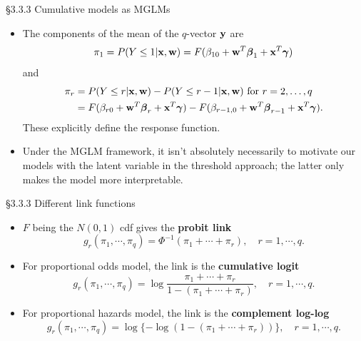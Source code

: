 \documentclass{beamer}
\newenvironment{wideitemize}%
  {\begin{itemize}%
    \setlength{\parskip}{1em}}%
  {\end{itemize}}
\begin{document}

\begin{frame}{\S3.3.3 Cumulative models as MGLMs}
\begin{wideitemize}


\item The components of the  mean of the $q$-vector ${\bf y}$  are  
\[
\pi_1 = P( Y \leq 1 | {\bf x}, {\bf w}) = F(\beta_{10}+\textbf{w}^T\mbox{\boldmath $\beta$}_1+
\textbf{x}^T\mbox{\boldmath $\gamma$})
\]
 and 
\begin{align*}
\pi_r 
& = P( Y \leq r | {\bf x}, {\bf w}) -  P( Y \leq r -1| {\bf x}, {\bf w}) \text{ for } r = 2, \dots, q\\
&= F(\beta_{r0}+\textbf{w}^T\mbox{\boldmath $\beta$}_r+
\textbf{x}^T\mbox{\boldmath $\gamma$}) - F(\beta_{r-1, 0}+\textbf{w}^T\mbox{\boldmath $\beta$}_{r-1}+
\textbf{x}^T\mbox{\boldmath $\gamma$}).
\end{align*}
 These explicitly define the response function.

\item Under the MGLM framework, it isn't absolutely necessarily  to motivate our models with the latent variable in the threshold approach; the latter only makes the model more interpretable.
\end{wideitemize}
\end{frame}


\begin{frame}{\S3.3.3 Different link functions}
\begin{wideitemize}
\item
$F$ being the $N(0,1)$ cdf gives the \textbf{probit link} 
$$g_r(\pi_1,\cdots,\pi_q)=\Phi^{-1}(\pi_1+\cdots+\pi_r), \quad r=1,\cdots,q.$$
\item
For proportional odds model, the link is the \textbf{cumulative logit}
$$g_r(\pi_1,\cdots,\pi_q)=\log\frac{\pi_1+\cdots+\pi_r}{1-(\pi_1+\cdots+\pi_r)}, \quad r=1,\cdots,q.$$
\item
For proportional hazards model, the link is the \textbf{complement log-log}
$$g_r(\pi_1,\cdots,\pi_q)=\log\{-\log(1-(\pi_1+\cdots+\pi_r))\}, \quad r=1,\cdots,q.$$
\end{wideitemize}

\end{frame}
\end{document}
